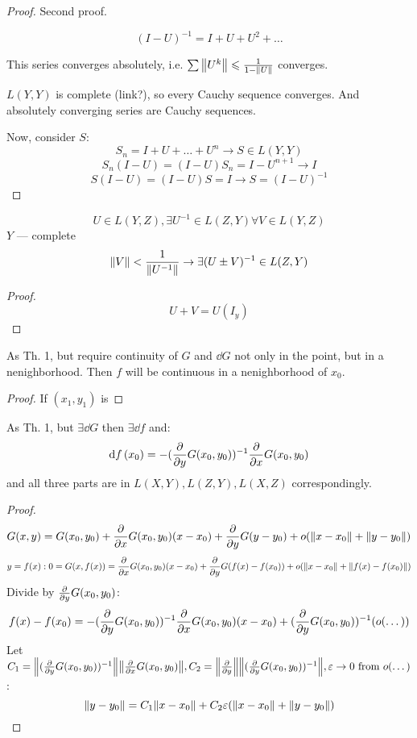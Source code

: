 \begin{proof} Second proof. 

\[ (I - U)^{-1} = I + U + U^2 + \dots \] 

This series converges absolutely, i.e. $\sum \norm{U^k} \leqslant \frac{1}{1 - \norm{U}}$ converges.

$L(Y, Y)$ is complete (link?), so every Cauchy sequence converges. And absolutely converging series are Cauchy sequences.

Now, consider $S$:
\[ S_n = I + U + \dots + U^n \to S \in L(Y, Y) \] 
\[ S_n(I - U) = (I - U)S_n = I - U^{n+1} \to I \] 
\[ S(I - U)  = (I - U)S = I \to S = (I - U)^{-1} \]

\end{proof}

\begin{thr} 
    \[ U \in L(Y, Z), \exists U^{-1} \in L(Z, Y) \forall V \in L(Y, Z) \] 
    $Y$ --- complete
    \[ \norm{V} < \frac{1}{\norm{U^{-1}}} \to \exists (U \pm V)^{-1} \in L(Z, Y) \]
\end{thr}
\begin{proof}
    \[ U + V = U(I_y)\]
\end{proof}

\begin{thr}
    As Th. 1, but require continuity of $G$ and $\dd{G}$ not only in the point,
    but in a nenighborhood. Then $f$ will be continuous in a nenighborhood of $x_0$.
\end{thr}

\begin{proof}
    If $(x_1, y_1)$ is 
\end{proof}

\begin{thr}
    As Th. 1, but $\exists \dd{G}$ then $\exists \dd{f}$ and:
    \[ \dd{f}\/(x_0) = -(\pdv{y} G(x_0, y_0))^{-1}\pdv{x}G(x_0, y_0) \] 
    and all three parts are in $L(X, Y), L(Z, Y), L(X, Z)$ correspondingly.
\end{thr}

\begin{proof}
    \[ G(x, y) = G(x_0, y_0) + \pdv{x}G(x_0, y_0)(x-x_0) + \pdv{y}G(y - y_0) + o(\norm{x - x_0} + \norm{y - y_0}) \] 
    \[ y = f(x): 0 = G(x, f(x)) = \pdv{x}G(x_0, y_0)(x-x_0) + \pdv{y}G(f(x) - f(x_0)) + o(\norm{x - x_0} + \norm{f(x) - f(x_0)}) \] 
    Divide by $\pdv{y}G(x_0, y_0)$:
    \[ f(x) - f(x_0) = -(\pdv{y}G(x_0, y_0))^{-1} \pdv{x}G(x_0, y_0) (x - x_0) + (\pdv{y}G(x_0, y_0))^{-1}(o(\dots)) \] 
    Let $C_1 = \norm{(\pdv{y}G(x_0, y_0))^{-1}} \norm{\pdv{x}G(x_0, y_0)}, C_2 = \norm{\pdv{y}} \norm{(\pdv{y}G(x_0, y_0))^{-1}}, \varepsilon \to 0 \text{ from } o(\dots)$:
    \[ \norm{y - y_0} = C_1 \norm{x - x_0} + C_2 \varepsilon (\norm{x - x_0} + \norm{y - y_0}) \] 
\end{proof}

